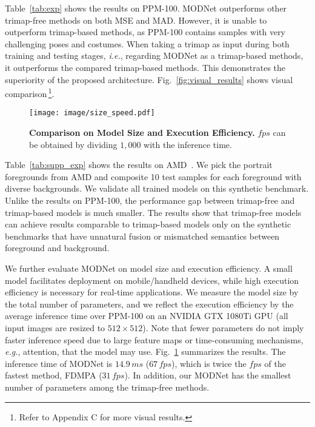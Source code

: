 \documentclass[letterpaper]{article} \usepackage{aaai22}  \usepackage{times}  \usepackage{helvet}  \usepackage{courier}  \usepackage[hyphens]{url}  \usepackage{graphicx} \urlstyle{rm} \def\UrlFont{\rm}  \usepackage{natbib}  \usepackage{caption} \usepackage{booktabs}
\begin{document}
Table~\ref{tab:exp} shows the results on PPM-100. MODNet outperforms other trimap-free methods on both MSE and MAD. However, it is unable to outperform trimap-based methods, as PPM-100 contains samples with very challenging poses and costumes. 
When taking a trimap as input during both training and testing stages, {\it i.e.}, regarding MODNet as a trimap-based methods,
it outperforms the compared trimap-based methods.
This demonstrates the superiority of the proposed architecture. Fig.~\ref{fig:visual_results} shows visual comparison\,\footnote{Refer to Appendix C for more visual results.}.





\begin{figure}[t]
\begin{center}
\texttt{[image: image/size\_speed.pdf]}
\end{center}
  \caption{\textbf{Comparison on Model Size and Execution Efficiency.} 
  $fps$ can be obtained by dividing $1,000$ with the inference time.
  }
\label{fig:efficient}
\end{figure}



Table~\ref{tab:supp_exp} shows the results on AMD~\cite{DIM}. We pick the portrait foregrounds from AMD and composite 10 test samples for each foreground with diverse backgrounds. We validate all trained models on this synthetic benchmark. Unlike the results on PPM-100, the performance gap between trimap-free and trimap-based models is much smaller. 
The results show that trimap-free models can achieve results comparable to trimap-based models only on the synthetic benchmarks that have unnatural fusion or mismatched semantics between foreground and background.




We further evaluate MODNet on model size and execution efficiency. A small model facilitates deployment on mobile/handheld devices, while high execution efficiency is necessary for real-time applications. We measure the model size by the total number of parameters, and we reflect the execution efficiency by the average inference time over PPM-100 on an NVIDIA GTX 1080Ti GPU (all input images are resized to $512\times512$). Note that fewer parameters do not imply faster inference speed due to large feature maps or time-consuming mechanisms, {\it e.g.}, attention, that the model may use. Fig.~\ref{fig:efficient} summarizes the results. The inference time of MODNet is $14.9\,ms$ ($67\,fps$), which is twice the $fps$ of the fastest method, FDMPA ($31\,fps$). In addition, our MODNet has the smallest number of parameters among the trimap-free methods.
\end{document}
